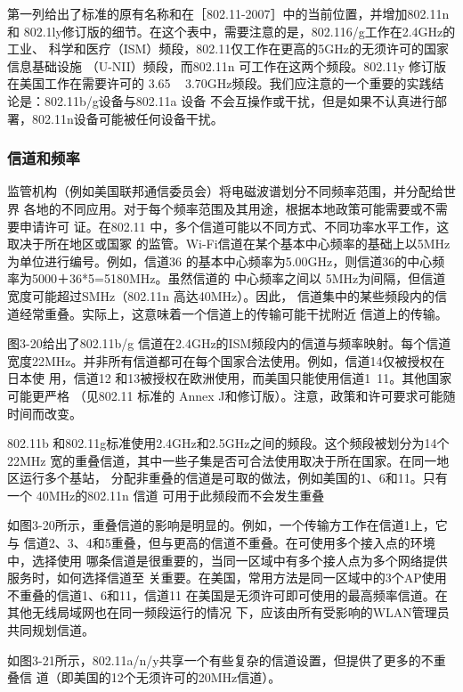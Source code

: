 第一列给出了标准的原有名称和在［802.11-2007］中的当前位置，并增加802.11n和
802.1ly修订版的细节。在这个表中，需要注意的是，802.116/g工作在2.4GHz的工业、
科学和医疗（ISM）频段，802.11仅工作在更高的5GHz的无须许可的国家信息基础设施
（U-NII）频段，而802.11n 可工作在这两个频段。802.11y 修订版在美国工作在需要许可的
3.65 ~ 3.70GHz频段。我们应注意的一个重要的实践结论是：802.11b/g设备与802.11a 设备
不会互操作或干扰，但是如果不认真进行部署，802.11n设备可能被任何设备干扰。

\subsubsection{信道和频率}

监管机构（例如美国联邦通信委员会）将电磁波谱划分不同频率范围，并分配给世界
各地的不同应用。对于每个频率范围及其用途，根据本地政策可能需要或不需要申请许可
证。在802.11 中，多个信道可能以不同方式、不同功率水平工作，这取决于所在地区或国冢
的监管。Wi-Fi信道在某个基本中心频率的基础上以5MHz为单位进行编号。例如，信道36
的基本中心频率为5.00GHz，则信道36的中心频率为5000＋36*5=5180MHz。虽然信道的
中心频率之间以 5MHz为间隔，但信道宽度可能超过SMHz（802.11n 高达40MHz）。因此，
信道集中的某些频段内的信道经常重叠。实际上，这意味着一个信道上的传输可能干扰附近
信道上的传输。

图3-20给出了802.11b/g 信道在2.4GHz的ISM频段内的信道与频率映射。每个信道
宽度22MHz。并非所有信道都可在每个国家合法使用。例如，信道14仅被授权在日本使
用，信道12 和13被授权在欧洲使用，而美国只能使用信道1~11。其他国家可能更严格
（见802.11 标准的 Annex J和修订版）。注意，政策和许可要求可能随时间而改变。

802.11b 和802.11g标准使用2.4GHz和2.5GHz之间的频段。这个频段被划分为14个 22MHz
宽的重叠信道，其中一些子集是否可合法使用取决于所在国家。在同一地区运行多个基站，
分配非重叠的信道是可取的做法，例如美国的1、6和11。只有一个 40MHz的802.11n 信道
可用于此频段而不会发生重叠

如图3-20所示，重叠信道的影响是明显的。例如，一个传输方工作在信道1上，它与
信道2、3、4和5重叠，但与更高的信道不重叠。在可使用多个接入点的环境中，选择使用
哪条信道是很重要的，当同一区域中有多个接人点为多个网络提供服务时，如何选择信道至
关重要。在美国，常用方法是同一区域中的3个AP使用不重叠的信道1、6和11，信道11
在美国是无须许可即可使用的最高频率信道。在其他无线局域网也在同一频段运行的情况
下，应该由所有受影响的WLAN管理员共同规划信道。

如图3-21所示，802.11a/n/y共享一个有些复杂的信道设置，但提供了更多的不重叠信
道（即美国的12个无须许可的20MHz信道）。

